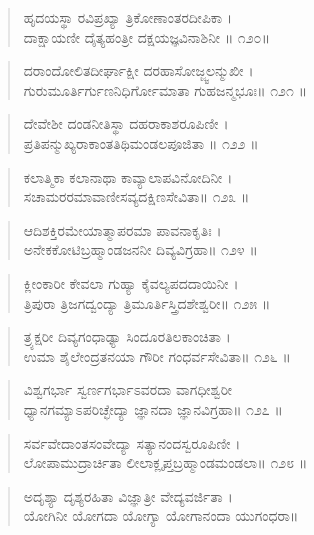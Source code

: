 \begin{verse}
ಹೃದಯಸ್ಥಾ ರವಿಪ್ರಖ್ಯಾ ತ್ರಿಕೋಣಾಂತರದೀಪಿಕಾ ।\\ದಾಕ್ಷಾಯಣೀ ದೈತ್ಯಹಂತ್ರೀ ದಕ್ಷಯಜ್ಞವಿನಾಶಿನೀ \num{॥ ೧೨೦॥}
\end{verse}

\begin{verse}
ದರಾಂದೋಲಿತದೀರ್ಘಾಕ್ಷೀ ದರಹಾಸೋಜ್ಜ್ವಲನ್ಮುಖೀ ।\\ಗುರುಮೂರ್ತಿರ್ಗುಣನಿಧಿರ್ಗೋಮಾತಾ ಗುಹಜನ್ಮಭೂಃ\num{॥ ೧೨೧ ॥}
\end{verse}

\begin{verse}
ದೇವೇಶೀ ದಂಡನೀತಿಸ್ಥಾ ದಹರಾಕಾಶರೂಪಿಣೀ ।\\ಪ್ರತಿಪನ್ಮುಖ್ಯರಾಕಾಂತತಿಥಿಮಂಡಲಪೂಜಿತಾ \num{॥ ೧೨೨ ॥}
\end{verse}

\begin{verse}
ಕಲಾತ್ಮಿಕಾ ಕಲಾನಾಥಾ ಕಾವ್ಯಾಲಾಪವಿನೋದಿನೀ ।\\ಸಚಾಮರರಮಾವಾಣೀಸವ್ಯದಕ್ಷಿಣಸೇವಿತಾ\num{॥ ೧೨೩ ॥}
\end{verse}

\begin{verse}
ಆದಿಶಕ್ತಿರಮೇಯಾತ್ಮಾಪರಮಾ ಪಾವನಾಕೃತಿಃ ।\\ಅನೇಕಕೋಟಿಬ್ರಹ್ಮಾಂಡಜನನೀ  ದಿವ್ಯವಿಗ್ರಹಾ\num{॥ ೧೨೪ ॥}
\end{verse}

\begin{verse}
ಕ್ಲೀಂಕಾರೀ ಕೇವಲಾ ಗುಹ್ಯಾ ಕೈವಲ್ಯಪದದಾಯಿನೀ ।\\ತ್ರಿಪುರಾ ತ್ರಿಜಗದ್ವಂದ್ಯಾ ತ್ರಿಮೂರ್ತಿಸ್ತ್ರಿದಶೇಶ್ವರೀ\num{॥ ೧೨೫ ॥}
\end{verse}

\begin{verse}
ತ್ರ್ಯಕ್ಷರೀ  ದಿವ್ಯಗಂಧಾಢ್ಯಾ ಸಿಂದೂರತಿಲಕಾಂಚಿತಾ ।\\ಉಮಾ ಶೈಲೇಂದ್ರತನಯಾ ಗೌರೀ ಗಂಧರ್ವಸೇವಿತಾ\num{॥ ೧೨೬ ॥}
\end{verse}

\begin{verse}
ವಿಶ್ವಗರ್ಭಾ ಸ್ವರ್ಣಗರ್ಭಾಽವರದಾ ವಾಗಧೀಶ್ವರೀ \\ಧ್ಯಾನಗಮ್ಯಾಽಪರಿಚ್ಛೇದ್ಯಾ ಜ್ಞಾನದಾ ಜ್ಞಾನವಿಗ್ರಹಾ\num{॥ ೧೨೭ ॥}
\end{verse}

\begin{verse}
ಸರ್ವವೇದಾಂತಸಂವೇದ್ಯಾ ಸತ್ಯಾನಂದಸ್ವರೂಪಿಣೀ ।\\ಲೋಪಾಮುದ್ರಾರ್ಚಿತಾ ಲೀಲಾಕ್ಲೃಪ್ತಬ್ರಹ್ಮಾಂಡಮಂಡಲಾ\num{॥ ೧೨೮ ॥}
\end{verse}

\begin{verse}
ಅದೃಶ್ಯಾ ದೃಶ್ಯರಹಿತಾ  ವಿಜ್ಞಾತ್ರೀ ವೇದ್ಯವರ್ಜಿತಾ ।\\ಯೋಗಿನೀ ಯೋಗದಾ ಯೋಗ್ಯಾ ಯೋಗಾನಂದಾ ಯುಗಂಧರಾ॥
\end{verse}

